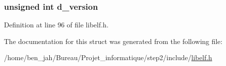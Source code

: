 \hypertarget{struct_elf___data_a39da3806e0e01d780fd0d28a05e36038}{
\subsubsection[{d\-\_\-version}]{\setlength{\rightskip}{0pt plus 5cm}unsigned int {\bf d\-\_\-version}}}\label{struct_elf___data_a39da3806e0e01d780fd0d28a05e36038}


\-Definition at line 96 of file libelf.\-h.



\-The documentation for this struct was generated from the following file\-:\begin{DoxyCompactItemize}
\item 
/home/ben\-\_\-jah/\-Bureau/\-Projet\-\_\-informatique/step2/include/\hyperlink{libelf_8h}{libelf.\-h}\end{DoxyCompactItemize}
